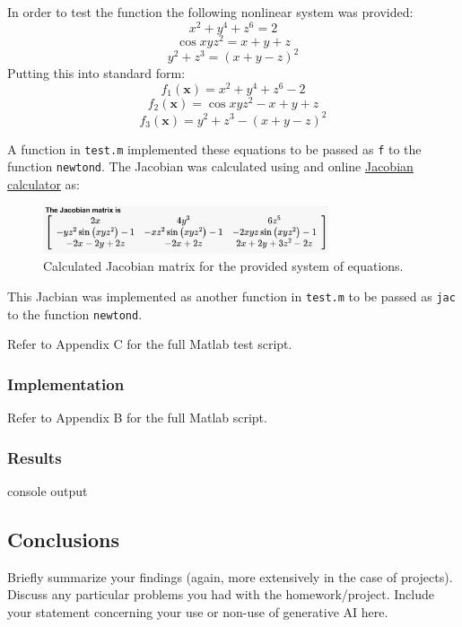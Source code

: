 \documentclass[10pt]{article}
\def\code#1{\texttt{#1}}
\begin{document}
In order to test the function the following nonlinear system was provided: 
$$x^2+y^4+z^6=2$$
$$\cos{xyz^2}=x+y+z$$
$$y^2+z^3=(x+y-z)^2$$
Putting this into standard form:
$$f_1(\mathbf{x})=x^2+y^4+z^6-2$$
$$f_2(\mathbf{x})=\cos{xyz^2}-x+y+z$$
$$f_3(\mathbf{x})=y^2+z^3-(x+y-z)^2$$

A function in \code{test.m} implemented these equations to be passed as \code{f} to the function \code{newtond}.
The Jacobian was calculated using and online
\href{https://www.emathhelp.net/en/calculators/calculus-3/jacobian-calculator/}{Jacobian calculator} as:

\begin{figure}[h!]
\centering
\includegraphics[width=0.75\textwidth]{Jacobian.png}
\caption{Calculated Jacobian matrix for the provided system of equations.}
\end{figure}

This Jacbian was implemented as another function in \code{test.m} to be passed as \code{jac} to the function 
\code{newtond}.

Refer to Appendix C for the full Matlab test script. 

\subsubsection*{Implementation}



Refer to Appendix B for the full Matlab script.

\subsubsection*{Results}

console output

\pagebreak

\subsection*{Conclusions}
Briefly summarize your findings (again, more extensively in the case of projects).
Discuss any particular problems you had with the homework/project.
Include your statement concerning your use or non-use of generative AI here.
\end{document}
